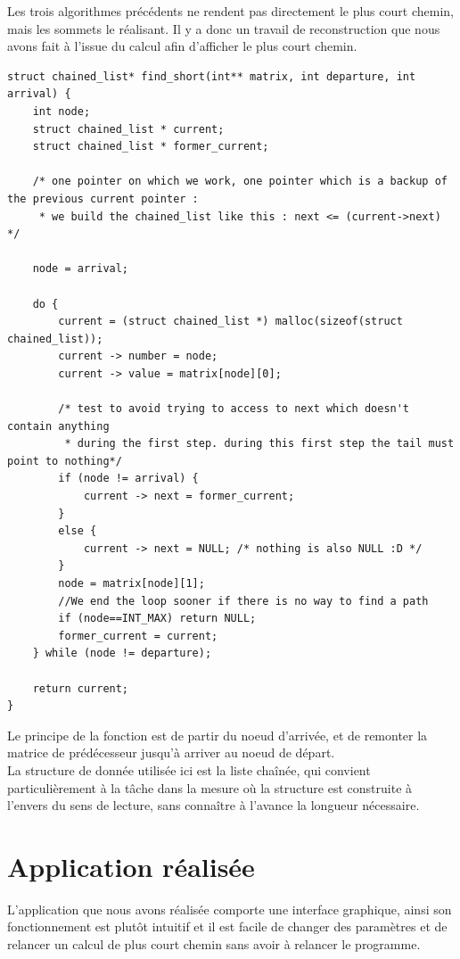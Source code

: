 \documentclass[a4paper,12pt,final] {article}
\begin{document}
Les trois algorithmes précédents ne rendent pas directement le plus court chemin, mais les sommets le réalisant. Il y a donc un travail de reconstruction que nous avons fait à l'issue du calcul afin d'afficher le plus court chemin.\\

\begin{lstlisting}
struct chained_list* find_short(int** matrix, int departure, int arrival) {
	int node;
	struct chained_list * current;
	struct chained_list * former_current;
	
	/* one pointer on which we work, one pointer which is a backup of the previous current pointer :
	 * we build the chained_list like this : next <= (current->next) */
	
	node = arrival;
	
	do {
		current = (struct chained_list *) malloc(sizeof(struct chained_list));
		current -> number = node;
		current -> value = matrix[node][0];
		
		/* test to avoid trying to access to next which doesn't contain anything 
		 * during the first step. during this first step the tail must point to nothing*/
		if (node != arrival) {
			current -> next = former_current;
		}
		else {
			current -> next = NULL; /* nothing is also NULL :D */
		}
		node = matrix[node][1];
		//We end the loop sooner if there is no way to find a path
		if (node==INT_MAX) return NULL;
		former_current = current;
	} while (node != departure);
	
	return current;
}
\end{lstlisting}

Le principe de la fonction est de partir du noeud d'arrivée, et de remonter la matrice de prédécesseur jusqu'à arriver au noeud de départ. \\

La structure de donnée utilisée ici est la liste chaînée, qui convient particulièrement à la tâche dans la mesure où la structure est construite à l'envers du sens de lecture, sans connaître à l'avance la longueur nécessaire.\\

\newpage
\section{Application réalisée}
L'application que nous avons réalisée comporte une interface graphique, ainsi son fonctionnement est plutôt intuitif et il est facile de changer des paramètres et de relancer un calcul de plus court chemin sans avoir à relancer le programme.
\end{document}
